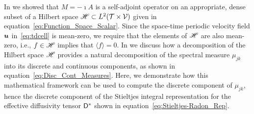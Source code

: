 \documentclass[amsa]{ipart}
\begin{document}
In  we showed that $M=-\imath A$ is a
self-adjoint operator on an appropriate, dense subset of a
Hilbert space $\mathscr{H}\subset L^2(\mathcal{T}\times\mathcal{V})$ given in
equation~\eqref{eq:Function_Space_Scalar}. Since the space-time
periodic velocity field $\boldsymbol{u}$ 
in~\eqref{eq:tdcell} is mean-zero, we require that the elements of
$\mathscr{H}$ are also mean-zero, i.e., $f\in\mathscr{H}$ implies that $\langle f\rangle=0$. In
 we discuss how a decomposition of the
Hilbert space $\mathscr{H}$ provides a natural decomposition of the spectral
measure $\mu_{jk}$ into its discrete and continuous components, as
shown in equation~\eqref{eq:Disc_Cont_Measures}. Here, we
demonstrate how this mathematical framework can be used to compute the
discrete component of $\mu_{jk}$, hence the discrete component of the
Stieltjes integral representation for the effective diffusivity tensor
$\mathsf{D}^*$ shown in equation~\eqref{eq:Stieltjes-Radon_Rep}.
\end{document}
